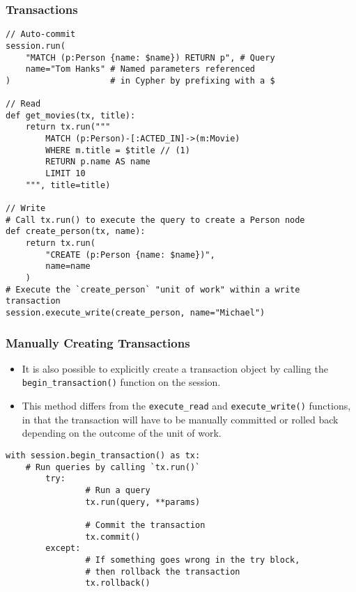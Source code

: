 \begin{frame}[fragile]\frametitle{Transactions}

\begin{lstlisting}
// Auto-commit
session.run(
    "MATCH (p:Person {name: $name}) RETURN p", # Query
    name="Tom Hanks" # Named parameters referenced
)                    # in Cypher by prefixing with a $

// Read
def get_movies(tx, title):
    return tx.run("""
        MATCH (p:Person)-[:ACTED_IN]->(m:Movie)
        WHERE m.title = $title // (1)
        RETURN p.name AS name
        LIMIT 10
    """, title=title)

// Write
# Call tx.run() to execute the query to create a Person node
def create_person(tx, name):
    return tx.run(
        "CREATE (p:Person {name: $name})",
        name=name
    )
# Execute the `create_person` "unit of work" within a write transaction
session.execute_write(create_person, name="Michael")		
\end{lstlisting}

\end{frame}


\begin{frame}[fragile]\frametitle{Manually Creating Transactions}

\begin{itemize}
\item It is also possible to explicitly create a transaction object by calling the \lstinline|begin_transaction()| function on the session.
\item This method differs from the \lstinline|execute_read| and \lstinline|execute_write()| functions, in that the transaction will have to be manually committed or rolled back depending on the outcome of the unit of work.
\end{itemize}

\begin{lstlisting}
with session.begin_transaction() as tx:
    # Run queries by calling `tx.run()`	
		try:
				# Run a query
				tx.run(query, **params)

				# Commit the transaction
				tx.commit()
		except:
				# If something goes wrong in the try block,
				# then rollback the transaction
				tx.rollback()
\end{lstlisting}
				
\end{frame}

